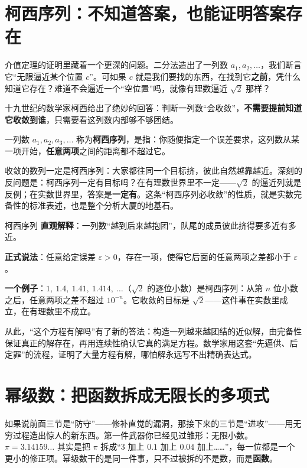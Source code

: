 \section{柯西序列：不知道答案，也能证明答案存在}

介值定理的证明里藏着一个更深的问题。二分法造出了一列数 $a_1,a_2,\dots$，我们断言它“无限逼近某个位置 $c$”。可如果 $c$ 就是我们要找的东西，在找到它\textbf{之前}，凭什么知道它存在？难道不会逼近一个“空位置”吗，就像有理数逼近 $\sqrt{2}$ 那样？

十九世纪的数学家柯西给出了绝妙的回答：判断一列数“会收敛”，\textbf{不需要提前知道它收敛到谁}，只需要看这列数内部够不够团结。

\begin{dingyi}
一列数 $a_1,a_2,a_3,\dots$ 称为\textbf{柯西序列}，是指：你随便指定一个误差要求，这列数从某一项开始，\textbf{任意两项}之间的距离都不超过它。
\end{dingyi}

收敛的数列一定是柯西序列：大家都往同一个目标挤，彼此自然越靠越近。深刻的反问题是：柯西序列一定有目标吗？在有理数世界里不一定——$\sqrt{2}$ 的逼近列就是反例；在实数世界里，答案是\textbf{一定有}。这条“柯西序列必收敛”的性质，就是实数完备性的标准表述，也是整个分析大厦的地基石。

\begin{shuyu}{柯西序列}
\textbf{直观解释}：一列数“越到后来越抱团”，队尾的成员彼此挤得要多近有多近。

\textbf{正式说法}：任意给定误差 $\varepsilon>0$，存在一项，使得它后面的任意两项之差都小于 $\varepsilon$。

\textbf{一个例子}：$1,\ 1.4,\ 1.41,\ 1.414,\ \dots$（$\sqrt{2}$ 的逐位小数）是柯西序列：从第 $n$ 位小数之后，任意两项之差不超过 $10^{-n}$。它收敛的目标是 $\sqrt{2}$——这件事在实数里成立，在有理数里不成立。
\end{shuyu}

从此，“这个方程有解吗”有了新的答法：构造一列越来越团结的近似解，由完备性保证真正的解存在，再用连续性确认它真的满足方程。数学家用这套“先逼供、后定罪”的流程，证明了大量方程有解，哪怕解永远写不出精确表达式。

\section{幂级数：把函数拆成无限长的多项式}

如果说前面三节是“防守”——修补直觉的漏洞，那接下来的三节是“进攻”——用无穷过程造出惊人的新东西。第一件武器你已经见过雏形：无限小数。$\pi=3.14159\dots$ 其实是把 $\pi$ 拆成“$3$ 加上 $0.1$ 加上 $0.04$ 加上……”，每一位都是一个更小的修正项。幂级数干的是同一件事，只不过被拆的不是数，而是\textbf{函数}。

